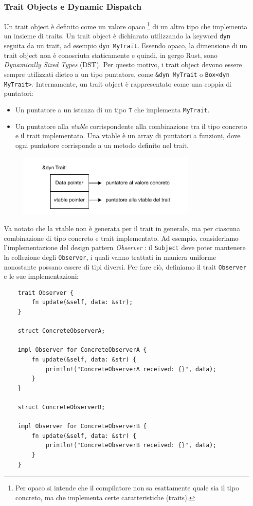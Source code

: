 \subsubsection{Trait Objects e Dynamic Dispatch}
\label{sec:trait_objects}
Un trait object è definito come un valore opaco \footnote{Per opaco si intende che il compilatore non sa esattamente quale sia il tipo concreto, ma che implementa certe caratteristiche (traits).} di un altro tipo che implementa un insieme di traits.  Un trait object è dichiarato utilizzando la keyword \texttt{dyn} seguita da un trait, ad esempio \texttt{dyn MyTrait}. Essendo opaco, la dimensione di un trait object non è conosciuta staticamente e quindi, in gergo Rust, sono \textit{Dynamically Sized Types} (DST). Per questo motivo, i trait object devono essere sempre utilizzati dietro a un tipo puntatore, come \texttt{\&dyn MyTrait} o \texttt{Box<dyn MyTrait>}. Internamente, un trait object è rappresentato come una coppia di puntatori:
\begin{itemize}
    \item Un puntatore a un istanza di un tipo \texttt{T} che implementa \texttt{MyTrait}.
    \item Un puntatore alla \textit{vtable} corrispondente alla combinazione tra il tipo concreto e il trait implementato. Una vtable è un array di puntatori a funzioni, dove ogni puntatore corrisponde a un metodo definito nel trait.
\end{itemize}  
\begin{figure}[H]
    \centering
    \includegraphics[width=0.8\textwidth]{Figures/vtable.drawio.pdf}
\end{figure}
Va notato che la vtable non è generata per il trait in generale, ma per ciascuna combinazione di tipo concreto e trait implementato. Ad esempio, consideriamo l'implementazione del design pattern \textit{Observer} \cite{gamma-design-patterns}: il \texttt{Subject} deve poter mantenere la collezione degli \texttt{Observer}, i quali vanno trattati in maniera uniforme nonostante possano essere di tipi diversi. Per fare ciò, definiamo il trait \texttt{Observer} e le sue implementazioni:
\begin{verbatim}
    trait Observer {
        fn update(&self, data: &str);
    }

    struct ConcreteObserverA;

    impl Observer for ConcreteObserverA {
        fn update(&self, data: &str) {
            println!("ConcreteObserverA received: {}", data);
        }
    }

    struct ConcreteObserverB;

    impl Observer for ConcreteObserverB {
        fn update(&self, data: &str) {
            println!("ConcreteObserverB received: {}", data);
        }
    }
\end{verbatim}
